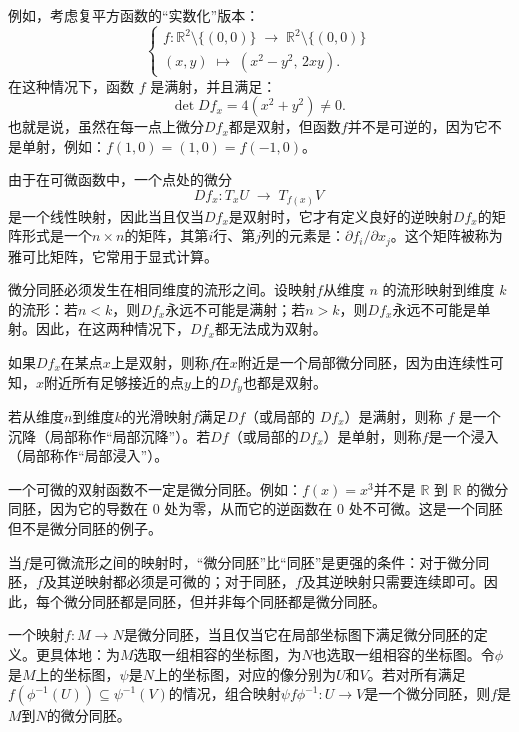 例如，考虑复平方函数的“实数化”版本：
  $$
  \begin{cases}
  f:\mathbb{R}^2 \setminus \{(0,0)\} \;\to\; \mathbb{R}^2 \setminus \{(0,0)\}\\
  (x,y) \;\mapsto\; (x^2 - y^2,\, 2xy).
  \end{cases}~
  $$
在这种情况下，函数 $f$ 是满射，并且满足：
  $$
  \det Df_x = 4(x^2 + y^2) \neq 0.~
  $$
也就是说，虽然在每一点上微分$Df_x$都是双射，但函数$f$并不是可逆的，因为它不是单射，例如：$f(1,0) = (1,0) = f(-1,0)$。

由于在可微函数中，一个点处的微分
  $$
  Df_x: T_xU \;\to\; T_{f(x)}V~
  $$
是一个线性映射，因此当且仅当$Df_x$是双射时，它才有定义良好的逆映射$Df_x$的矩阵形式是一个$n \times n$的矩阵，其第$i$行、第$j$列的元素是：$\partial f_i/\partial x_j$。这个矩阵被称为雅可比矩阵，它常用于显式计算。

微分同胚必须发生在相同维度的流形之间。设映射$f$从维度 $n$ 的流形映射到维度 $k$ 的流形：若$n < k$，则$Df_x$永远不可能是满射；若$n > k$，则$Df_x$永远不可能是单射。因此，在这两种情况下，$Df_x$都无法成为双射。

如果$Df_x$在某点$x$上是双射，则称$f$在$x$附近是一个局部微分同胚，因为由连续性可知，$x$附近所有足够接近的点$y$上的$Df_y$也都是双射。

若从维度$n$到维度$k$的光滑映射$f$满足$Df$（或局部的 $Df_x$）是满射，则称 $f$ 是一个沉降（局部称作“局部沉降”）。若$Df$（或局部的$Df_x$）是单射，则称$f$是一个浸入（局部称作“局部浸入”）。

一个可微的双射函数不一定是微分同胚。例如：$f(x) = x^3$并不是 $\mathbb{R}$ 到 $\mathbb{R}$ 的微分同胚，因为它的导数在 $0$ 处为零，从而它的逆函数在 $0$ 处不可微。这是一个同胚但不是微分同胚的例子。

当$f$是可微流形之间的映射时，“微分同胚”比“同胚”是更强的条件：对于微分同胚，$f$及其逆映射都必须是可微的；对于同胚，$f$及其逆映射只需要连续即可。因此，每个微分同胚都是同胚，但并非每个同胚都是微分同胚。

一个映射$f: M \to N$是微分同胚，当且仅当它在局部坐标图下满足微分同胚的定义。更具体地：为$M$选取一组相容的坐标图，为$N$也选取一组相容的坐标图。令$\phi$ 是$M$上的坐标图，$\psi$是$N$上的坐标图，对应的像分别为$U$和$V$。若对所有满足$f(\phi^{-1}(U)) \subseteq \psi^{-1}(V)$的情况，组合映射$\psi f \phi^{-1}: U \to V$是一个微分同胚，则$f$是$M$到$N$的微分同胚。
